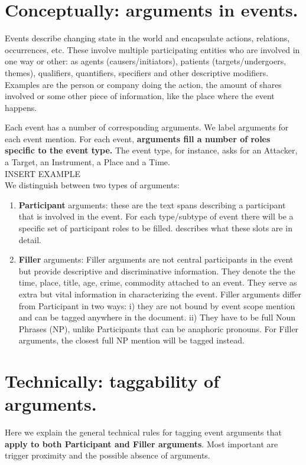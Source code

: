 \section{Conceptually: arguments in events.}
Events describe changing state in the world and encapsulate actions, relations, occurrences, etc.
These involve multiple participating entities who are involved in one way or other:
as agents (causers/initiators), patients (targets/undergoers, themes), qualifiers, quantifiers, specifiers and other descriptive modifiers.
Examples are the person or company doing the action, the amount of shares involved or some other piece of information, like the place where the event happens.

Each event has a number of corresponding arguments.
We label arguments for each event mention.
For each event, \textbf{arguments fill a number of roles specific to the event type.}
The  event type, for instance, asks for an Attacker, a Target, an Instrument, a Place and a Time.\\

INSERT EXAMPLE\\

We distinguish between two types of arguments:
\begin{enumerate}
    \item \textbf{Participant} arguments: these are the text spans describing a participant that is involved in the event. 
    For each type/subtype of event there will be a specific set of participant roles to be filled.  describes what these slots are in detail.
    \item \textbf{Filler} arguments:
    Filler arguments are not central participants in the event but provide descriptive and discriminative information.
    They denote the the time, place, title, age, crime, commodity attached to an event.
    They serve as extra but vital information in characterizing the event.
    Filler arguments differ from Participant in two ways:
    i) they are not bound by event scope mention and can be tagged anywhere in the document.
    ii) They have to be full Noun Phrases (NP), unlike Participants that can be anaphoric pronouns.
    For Filler arguments, the closest full NP mention will be tagged instead.
\end{enumerate}

\section{Technically: taggability of arguments.}
Here we explain the general technical rules for tagging event arguments that \textbf{apply to both Participant and Filler arguments}.
Most important are trigger proximity and the possible absence of arguments.\\

